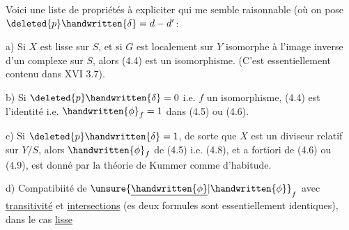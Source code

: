 Voici une liste de propriétés à expliciter qui me semble raisonnable\deleted{\unsure{;|:}} (où on pose $\deleted{p}\handwritten{\delta}=d-d'$\deleted{;}\handwritten{)}:

a) Si $X$ est lisse sur $S$, et si $G$ est localement sur $Y$ isomorphe à l'image inverse d'un complexe sur $S$, alors (4.4) est un isomorphisme. (C'est essentiellement contenu dans XVI 3.7).

b) Si $\deleted{p}\handwritten{\delta}=0$ i.e. $f$ un isomorphisme, (4.4) est l'identité i.e. $\handwritten{\phi}_f=1$ dans (4.5) ou (4.6).

c) Si $\deleted{p}\handwritten{\delta}=1$, de sorte que $X$ est un diviseur relatif sur $Y/S$, alors $\handwritten{\phi}_f$ de (4.5) i.e. (4.8), et a fortiori de (4.6) ou (4.9), est donné par la théorie de Kummer comme d'habitude.

d) Compatibiité de $\unsure{\underline{\handwritten{\phi}}|\handwritten{\phi}}_f$ avec \uline{transitivité} et \uline{intersections} (es deux formules sont essentiellement identiques), dans le cas \uline{lisse}\handwritten{\unsure{,|;}}

